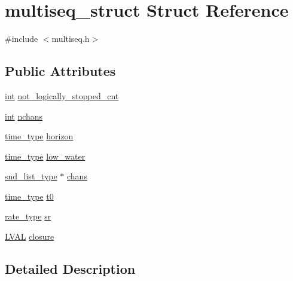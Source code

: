 \hypertarget{structmultiseq__struct}{}\section{multiseq\+\_\+struct Struct Reference}
\label{structmultiseq__struct}


{\ttfamily \#include $<$multiseq.\+h$>$}

\subsection*{Public Attributes}
\begin{DoxyCompactItemize}
\item 
\hyperlink{xmltok_8h_a5a0d4a5641ce434f1d23533f2b2e6653}{int} \hyperlink{structmultiseq__struct_a263b80e299857699061a6ad9a1b16b42}{not\+\_\+logically\+\_\+stopped\+\_\+cnt}
\item 
\hyperlink{xmltok_8h_a5a0d4a5641ce434f1d23533f2b2e6653}{int} \hyperlink{structmultiseq__struct_ae928e5642ce3c69bfa88487f47b6c2f9}{nchans}
\item 
\hyperlink{midifns_8h_a3f787491db5dbc75c21b27d54e9ebae6}{time\+\_\+type} \hyperlink{structmultiseq__struct_a6271d06189f60f3432c9733c74b937ea}{horizon}
\item 
\hyperlink{midifns_8h_a3f787491db5dbc75c21b27d54e9ebae6}{time\+\_\+type} \hyperlink{structmultiseq__struct_acd56033becba780f5c56cbdf57a0c7ec}{low\+\_\+water}
\item 
\hyperlink{sound_8h_ab05388854adb60c2855a70276d2ceb65}{snd\+\_\+list\+\_\+type} $\ast$ \hyperlink{structmultiseq__struct_aa5939cb8e7c29d76dcafbe47a4425f0f}{chans}
\item 
\hyperlink{midifns_8h_a3f787491db5dbc75c21b27d54e9ebae6}{time\+\_\+type} \hyperlink{structmultiseq__struct_a84bdbe24222b16bbd35564d497228e2d}{t0}
\item 
\hyperlink{sound_8h_a80a6a98ce803ce7a00e744aa2103f9a1}{rate\+\_\+type} \hyperlink{structmultiseq__struct_af45a4b34bb099aee40e63e5061c449b4}{sr}
\item 
\hyperlink{xldmem_8h_a9a9ec6a5fbca2b40ed8d19faa799be8c}{L\+V\+AL} \hyperlink{structmultiseq__struct_aba2e5a8de28b9dc2ad0c6340da20efbf}{closure}
\end{DoxyCompactItemize}


\subsection{Detailed Description}


